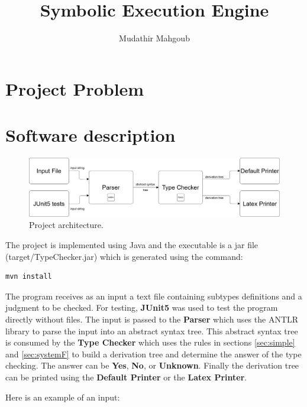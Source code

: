 \documentclass[12pt,a4paper]{article}
\author{Mudathir Mahgoub}
\title{Symbolic Execution Engine}
\begin{document}
\maketitle

\section {Project Problem}

\section{Software description} \label{sec:software}


\begin{figure}[h]
 \centering
 \includegraphics[scale=.25,keepaspectratio=true]{./engine.png}
 \caption{Project architecture.}
 \label{fig:gantt_chart}
\end{figure}

The project is implemented using Java and the executable is a jar file (target/TypeChecker.jar) which is generated using the command:

\begin{lstlisting}  
mvn install
\end{lstlisting}  

The program receives as an input a text file containing subtypes definitions and a judgment to be checked. For testing, \textbf{JUnit5} was used to test the program directly without files. The input is passed to the \textbf{Parser} which uses the ANTLR library to parse the input into an abstract syntax tree. This abstract syntax tree is consumed by the \textbf{Type Checker} which uses the rules in sections \ref{sec:simple} and \ref{sec:systemF} to build a derivation tree and determine the answer of the type checking. The answer can be \textbf{Yes}, \textbf{No}, or \textbf{Unknown}. Finally the derivation tree can be printed using the \textbf{Default Printer} or the \textbf{Latex Printer}.


Here is an example of an input:
\end{document}
